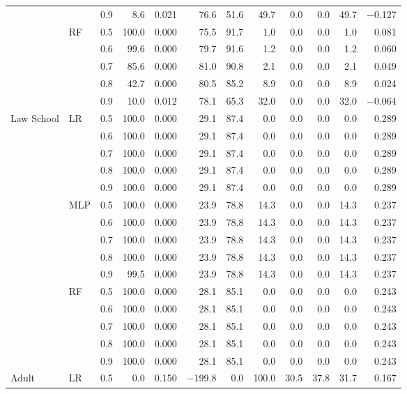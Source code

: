 \begin{table}[t]
\begin{tabular}{lllrrrrrrrrr}
 &  & 0.9 & 8.6 & 0.021 & 76.6 & 51.6 & 49.7 & 0.0 & 0.0 & 49.7 & $-$0.127 \\
\cline{2-12}
 & RF & 0.5 & 100.0 & 0.000 & 75.5 & 91.7 & 1.0 & 0.0 & 0.0 & 1.0 & 0.081 \\
 &  & 0.6 & 99.6 & 0.000 & 79.7 & 91.6 & 1.2 & 0.0 & 0.0 & 1.2 & 0.060 \\
 &  & 0.7 & 85.6 & 0.000 & 81.0 & 90.8 & 2.1 & 0.0 & 0.0 & 2.1 & 0.049 \\
 &  & 0.8 & 42.7 & 0.000 & 80.5 & 85.2 & 8.9 & 0.0 & 0.0 & 8.9 & 0.024 \\
 &  & 0.9 & 10.0 & 0.012 & 78.1 & 65.3 & 32.0 & 0.0 & 0.0 & 32.0 & $-$0.064 \\
\hline
Law School & LR & 0.5 & 100.0 & 0.000 & 29.1 & 87.4 & 0.0 & 0.0 & 0.0 & 0.0 & 0.289 \\
 &  & 0.6 & 100.0 & 0.000 & 29.1 & 87.4 & 0.0 & 0.0 & 0.0 & 0.0 & 0.289 \\
 &  & 0.7 & 100.0 & 0.000 & 29.1 & 87.4 & 0.0 & 0.0 & 0.0 & 0.0 & 0.289 \\
 &  & 0.8 & 100.0 & 0.000 & 29.1 & 87.4 & 0.0 & 0.0 & 0.0 & 0.0 & 0.289 \\
 &  & 0.9 & 100.0 & 0.000 & 29.1 & 87.4 & 0.0 & 0.0 & 0.0 & 0.0 & 0.289 \\
\cline{2-12}
 & MLP & 0.5 & 100.0 & 0.000 & 23.9 & 78.8 & 14.3 & 0.0 & 0.0 & 14.3 & 0.237 \\
 &  & 0.6 & 100.0 & 0.000 & 23.9 & 78.8 & 14.3 & 0.0 & 0.0 & 14.3 & 0.237 \\
 &  & 0.7 & 100.0 & 0.000 & 23.9 & 78.8 & 14.3 & 0.0 & 0.0 & 14.3 & 0.237 \\
 &  & 0.8 & 100.0 & 0.000 & 23.9 & 78.8 & 14.3 & 0.0 & 0.0 & 14.3 & 0.237 \\
 &  & 0.9 & 99.5 & 0.000 & 23.9 & 78.8 & 14.3 & 0.0 & 0.0 & 14.3 & 0.237 \\
\cline{2-12}
 & RF & 0.5 & 100.0 & 0.000 & 28.1 & 85.1 & 0.0 & 0.0 & 0.0 & 0.0 & 0.243 \\
 &  & 0.6 & 100.0 & 0.000 & 28.1 & 85.1 & 0.0 & 0.0 & 0.0 & 0.0 & 0.243 \\
 &  & 0.7 & 100.0 & 0.000 & 28.1 & 85.1 & 0.0 & 0.0 & 0.0 & 0.0 & 0.243 \\
 &  & 0.8 & 100.0 & 0.000 & 28.1 & 85.1 & 0.0 & 0.0 & 0.0 & 0.0 & 0.243 \\
 &  & 0.9 & 100.0 & 0.000 & 28.1 & 85.1 & 0.0 & 0.0 & 0.0 & 0.0 & 0.243 \\
\hline
Adult & LR & 0.5 & 0.0 & 0.150 & $-$199.8 & 0.0 & 100.0 & 30.5 & 37.8 & 31.7 & 0.167 \\

\end{tabular}
\end{table}
